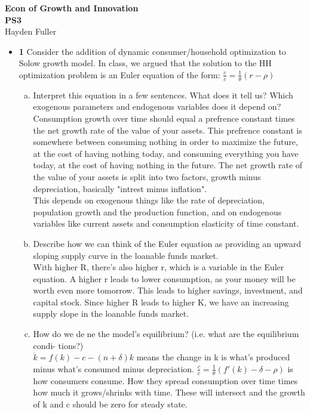 \documentclass[11pt]{article}
\begin{document}
\thispagestyle{empty}   %

\begin{center}
\large
\textbf{Econ of Growth and Innovation \\
PS3}
\\Hayden Fuller
\end{center}

\begin{itemize}

\item \textbf{1} 
Consider the addition of dynamic consumer/household optimization to Solow growth
model. In class, we argued that the solution to the HH optimization problem is an
Euler equation of the form: $\frac{\dot c}{c}=\frac{1}{\theta}(r-\rho)$
\begin{enumerate}[(a)]
\item Interpret this equation in a few sentences. What does it tell us? Which exogenous
parameters and endogenous variables does it depend on?
\\Consumption growth over time should equal a prefrence constant times the net growth rate of the value of your assets. This prefrence constant is somewhere between consuming nothing in order to maximize the future, at the cost of having nothing today, and consuming everything you have today, at the cost of having nothing in the future. The net growth rate of the value of your assets is split into two factors, growth minus depreciation, basically "intrest minus inflation".
\\This depends on exogenous things like the rate of depreciation, population growth and the production function, and on endogenous variables like current assets and consumption elasticity of time constant.
\item Describe how we can think of the Euler equation as providing an upward sloping
supply curve in the loanable funds market.
\\With higher R, there's also higher r, which is a variable in the Euler equation. A higher r leads to lower consumption, as your money will be worth even more tomorrow. This leads to higher savings, investment, and capital stock. Since higher R leads to higher K, we have an increasing supply slope in the loanable funds market.
\item How do we dene the model's equilibrium? (i.e. what are the equilibrium condi-
tions?)
\\$\dot k=f(k)-c-(n+\delta)k$ means the change in k is what's produced minus what's consumed minus depreciation. $\frac{\dot c}{c}=\frac{1}{\theta}(f'(k)-\delta-\rho)$ is how consumers consume. How they spread consumption over time times how much it grows/shrinks with time. These will intersect and the growth of k and c should be zero for steady state.

\end{enumerate}
\end{itemize}
\end{document}
